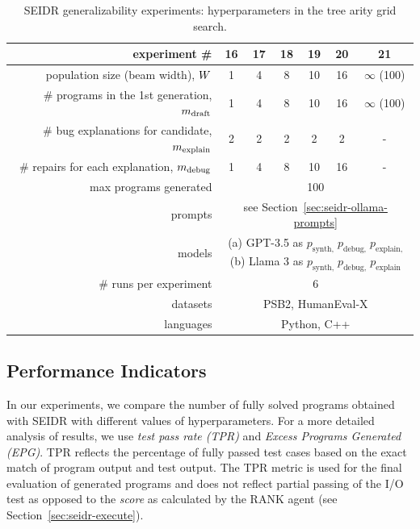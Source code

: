 \begin{table}[t]
\setlength{\tabcolsep}{10pt}
\centering
\caption{SEIDR generalizability experiments: hyperparameters in the tree arity grid search.}\small
\label{tab:w-n-generalizability}
\begin{tabular}{rcccccc}
\toprule
experiment \# & 16 & 17 & 18 & 19 & 20 & 21\\
\midrule
population size (beam width), $W{}$ & 1 & 4 & 8 & 10 & 16 & $\infty$ (100) \\[4pt]
\# programs in the 1st generation, $m_\text{draft}$ & 1 & 4 & 8 & 10 & 16 & $\infty$ (100) \\[4pt]
\# bug explanations for candidate, $m_\text{explain}$ & 2 & 2 & 2 & 2 & 2 & - \\[4pt]
\# repairs for each explanation, $m_\text{debug}$ & 1 & 4 & 8 & 10 & 16 & - \\[4pt]
\midrule
max programs generated & \multicolumn{6}{c}{100} \\[4pt]
prompts & \multicolumn{6}{c}{see Section~\ref{sec:seidr-ollama-prompts}} \\[4pt]
models  & \multicolumn{6}{c}{
 \parbox{5cm}{
     (a) GPT-3.5 as $p_\text{synth,} \; p_\text{debug,} \; p_\text{explain,}$ \\
     (b) Llama 3 as $p_\text{synth,} \; p_\text{debug,} \; p_\text{explain}$
     }
} \\[10pt]
\midrule
\# runs per experiment &  \multicolumn{6}{c}{6} \\[4pt]
datasets  & \multicolumn{6}{c}{PSB2, HumanEval-X} \\[4pt] 
languages  & \multicolumn{6}{c}{Python, C++} \\[4pt]
\bottomrule
\end{tabular}
\end{table}

\subsection{Performance Indicators}
\label{sec:seidr-metrics}

\sloppy %
In our experiments, we compare 
the number of fully solved programs obtained with SEIDR with different values of hyperparameters. 
For a more detailed analysis of results, we use \emph{test pass rate (TPR)} and \emph{Excess Programs Generated (EPG)}.
TPR reflects the percentage of fully passed test cases based on the exact match of program output and test output. 
The TPR metric is used for the final evaluation of generated programs and does not reflect partial passing of the I/O test as opposed to the \emph{score} as calculated by the RANK agent (see Section~\ref{sec:seidr-execute}). 

